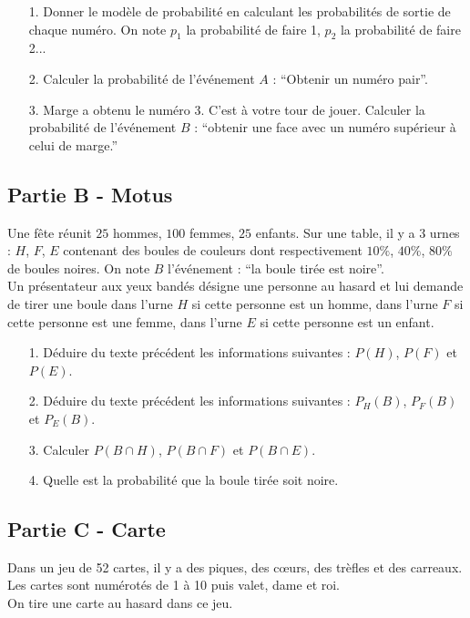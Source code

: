 \documentclass[12pt]{article}
\begin{document}
\begin{enumerate}
\item[1.] Donner le modèle de probabilité en calculant les probabilités de sortie de chaque numéro. On note $p_1$ la probabilité de faire 1, $p_2$ la probabilité de faire 2...
\item[2.] Calculer la probabilité de l'événement $A$ : ``Obtenir un numéro pair''.
\item[3.] Marge a obtenu le numéro 3. C'est à votre tour de jouer. Calculer la probabilité de l'événement $B$ : ``obtenir une face avec un numéro supérieur à celui de marge.''
\end{enumerate}


\subsection*{Partie B - Motus}

Une fête réunit $25$ hommes, $100$ femmes, $25$ enfants. Sur une table, il y a $3$ urnes : $H$, $F$, $E$ contenant des boules de couleurs dont respectivement $10\%$, $40\%$, $80\%$ de boules noires. On note $B$ l'événement : ``la boule tirée est noire''.\\
Un présentateur aux yeux bandés désigne une personne au hasard et lui demande de tirer une boule dans l’urne $H$ si cette personne est un homme, dans l’urne $F$ si cette personne est une femme, dans l’urne $E$ si cette personne est un enfant.

\begin{enumerate}
\item[1.] Déduire du texte précédent les informations suivantes : $P(H)$, $P(F)$ et 
$P(E)$.
\item[2.] Déduire du texte précédent les informations suivantes : $P_H(B)$, $P_F(B)$ et $P_E(B)$.
\item[3.] Calculer $P(B \cap H)$, $P(B \cap F)$ et $P(B \cap E)$.
\item[4.] Quelle est la probabilité que la boule tirée soit noire.
\end{enumerate}

\subsection*{Partie C - Carte}

Dans un jeu de 52 cartes, il y a des piques, des cœurs, des trèfles et des carreaux. Les cartes sont numérotés de 1 à 10 puis valet, dame et roi.\\
On tire une carte au hasard dans ce jeu.
\end{document}
